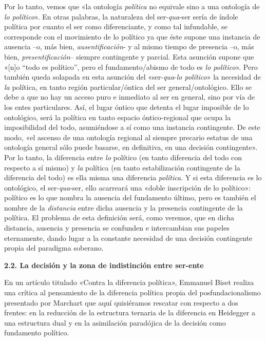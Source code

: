 Por lo tanto, vemos que «la ontología \emph{política }no equivale sino a una ontología de \emph{lo político}». En otras palabras, la naturaleza del ser-\emph{qua}-ser sería de índole política por cuanto el ser como diferenciante, y como tal infundable, se corresponde con el movimiento de lo político ya que éste supone una instancia de ausencia --o, más bien, \emph{ausentificación}- y al mismo tiempo de presencia --o, más bien, \emph{presentificación}-- siempre contingente y parcial. Esta asunción supone que «{[}n{]}o ``todo es político'', pero el fundamento/abismo de todo es \emph{lo político}». Pero también queda solapada en esta asunción del «ser-\emph{qua}-\emph{lo político}» la necesidad de \emph{la }política, en tanto región particular/óntica del ser general/ontológico. Ello se debe a que no hay un acceso puro e inmediato al ser en general, sino por vía de los entes particulares. Así, el lugar óntico que detenta el lugar imposible de lo ontológico, será la política en tanto espacio óntico-regional que ocupa la imposibilidad del todo, asumiéndose a sí como una instancia contingente. De este modo, «el ascenso de una ontología regional al siempre precario estatus de una ontología general sólo puede basarse, en definitiva, en una decisión contingente». Por lo tanto, la diferencia entre \emph{lo }político (en tanto diferencia del todo con respecto a sí mismo) y \emph{la }política (en tanto estabilización contingente de la diferencia del todo) es ella misma una diferencia \emph{política}. Y si esta diferencia es lo ontológico, el ser-\emph{qua}-ser, ello acarreará una «doble inscripción de lo político»: político es lo que nombra la ausencia del fundamento último, pero es también el nombre de la \emph{distancia} entre dicha ausencia y la presencia contingente de la política. El problema de esta definición será, como veremos, que en dicha distancia, ausencia y presencia se confunden e intercambian sus papeles eternamente, dando lugar a la constante necesidad de una decisión contingente propia del paradigma soberano.

\textbf{2.2. La decisión y la zona de indistinción entre ser-ente}

En un artículo titulado «Contra la diferencia política», Emmanuel Biset realiza una crítica al pensamiento de la diferencia política propia del posfundacionalismo presentado por Marchart que aquí quisiéramos rescatar con respecto a dos frentes: en la reducción de la estructura ternaria de la diferencia en Heidegger a una estructura dual y en la asimilación paradójica de la decisión como fundamento político.

